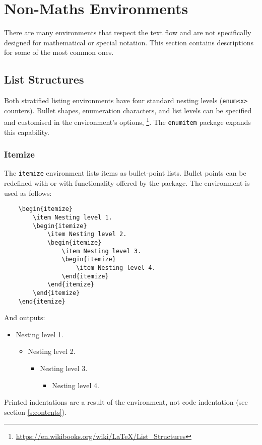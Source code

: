 \chapter{Non-Maths Environments}
%
There are many environments that respect the text flow and are not
specifically designed for mathematical or special notation.  This
section contains descriptions for some of the most common ones.
%
\section{List Structures}
%
Both stratified listing environments have four standard nesting levels
(\verb|enum<x>| counters).  Bullet shapes, enumeration characters, and
list levels can be specified and customised in the environment's
options,
\footnote{\url{https://en.wikibooks.org/wiki/LaTeX/List_Structures}}.
  The \verb|enumitem| package expands this capability.
%
\subsection{Itemize}
%
The \verb|itemize| environment lists items as bullet-point lists.
Bullet points can be redefined with  or with
functionality offered by the  package.  The environment
is used as follows:
\begin{verbatim}
	\begin{itemize}
    	\item Nesting level 1.
	    \begin{itemize}
    	    \item Nesting level 2.
        	\begin{itemize}
            	\item Nesting level 3.
	            \begin{itemize}
    	            \item Nesting level 4.
        	    \end{itemize}
	        \end{itemize}
	    \end{itemize}
	\end{itemize}
\end{verbatim}
And outputs:
\begin{itemize}
\item Nesting level 1.
  \begin{itemize}
  \item Nesting level 2.
    \begin{itemize}
    \item Nesting level 3.
      \begin{itemize}
      \item Nesting level 4.
      \end{itemize}
    \end{itemize}
  \end{itemize}
\end{itemize}
Printed indentations are a result of the environment, not code
indentation (see section \ref{s:contents}).
%
